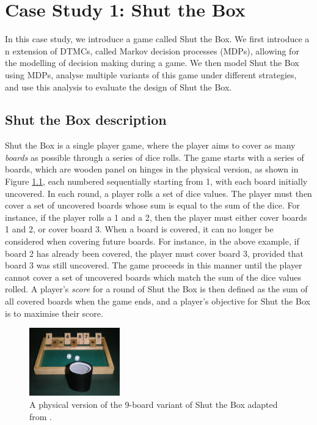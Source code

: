 \chapter{Case Study 1: Shut the Box}
\label{cs1}

In this case study, we introduce a game called Shut the Box. We first introduce a n extension of DTMCs, called Markov decision processes (MDPs), allowing for the modelling of decision making during a game. We then model Shut the Box using MDPs, analyse multiple variants of this game under different strategies, and use this analysis to evaluate the design of Shut the Box.

\section{Shut the Box description}
\label{cs1:stb_description}

Shut the Box is a single player game, where the player aims to cover as many \emph{boards} as possible through a series of dice rolls. The game starts with a series of boards, which are wooden panel on hinges in the physical version, as shown in Figure \ref{cs1:physical_stb}, each numbered sequentially starting from 1, with each board initially uncovered. In each round, a player rolls a set of dice values. The player must then cover a set of uncovered boards whose sum is equal to the sum of the dice. For instance, if the player rolls a 1 and a 2, then the player must either cover boards 1 and 2, or cover board 3. When a board is covered, it can no longer be considered when covering future boards. For instance, in the above example, if board 2 has already been covered, the player must cover  board 3, provided that board 3 was still uncovered. The game proceeds in this manner until the player cannot cover a set of uncovered boards which match the sum of the dice values rolled. A player's \emph{score} for a round of Shut the Box is then defined as the sum of all covered boards when the game ends, and a player's objective for Shut the Box is to maximise their score.

\begin{figure}[h]
    \centering
    \includegraphics[width=0.35\textwidth]{images/shut_the_box.jpg}
    \caption{A physical version of the 9-board variant of Shut the Box adapted from \cite{wikipedia_deutsch_2006}.}
    \label{cs1:physical_stb}
\end{figure}

